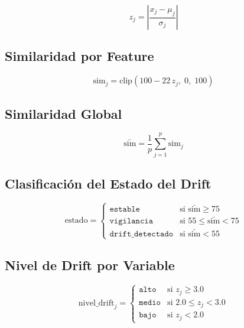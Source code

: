 \documentclass[12pt, a4paper]{article}
\begin{document}
\begin{equation}
  z_j = \left| \frac{x_j - \mu_j}{\sigma_j} \right|
  \label{eq:zscore}
\end{equation}

\subsection{Similaridad por Feature}

\begin{equation}
  \text{sim}_j = \text{clip}\!\left(100 - 22\, z_j,\; 0,\; 100\right)
  \label{eq:similitud}
\end{equation}

\subsection{Similaridad Global}

\begin{equation}
  \bar{\text{sim}} = \frac{1}{p} \sum_{j=1}^{p} \text{sim}_j
  \label{eq:sim_global}
\end{equation}

\subsection{Clasificación del Estado del Drift}

\begin{equation}
  \text{estado} =
  \begin{cases}
    \texttt{estable}          & \text{si } \bar{\text{sim}} \geq 75 \\
    \texttt{vigilancia}       & \text{si } 55 \leq \bar{\text{sim}} < 75 \\
    \texttt{drift\_detectado} & \text{si } \bar{\text{sim}} < 55
  \end{cases}
  \label{eq:drift_estado}
\end{equation}

\subsection{Nivel de Drift por Variable}

\begin{equation}
  \text{nivel\_drift}_j =
  \begin{cases}
    \texttt{alto}  & \text{si } z_j \geq 3.0 \\
    \texttt{medio} & \text{si } 2.0 \leq z_j < 3.0 \\
    \texttt{bajo}  & \text{si } z_j < 2.0
  \end{cases}
  \label{eq:drift_nivel}
\end{equation}
\end{document}
